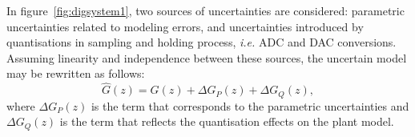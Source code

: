 \documentclass{sig-alternate-05-2015}
\newcommand{\red}[1]{{\color{red}#1}}
\begin{document}
%
In figure~\ref{fig:digsystem1}, two sources of uncertainties are considered: parametric uncertainties related to modeling errors, and uncertainties introduced by quantisations in sampling and holding process, {\it i.e.} ADC and DAC conversions. Assuming linearity and independence between these sources, the uncertain model may be rewritten as follows:
\begin{equation}
\label{eq:complete_unc_model}
\hat{G}(z)=G(z)+\Delta G_{P}(z)+\Delta G_{Q}(z),
\end{equation}
where $\Delta G_{P}(z)$ is the term that corresponds to the parametric uncertainties and $\Delta G_{Q}(z)$ is the term that reflects the quantisation effects on the plant model. %
\end{document}
